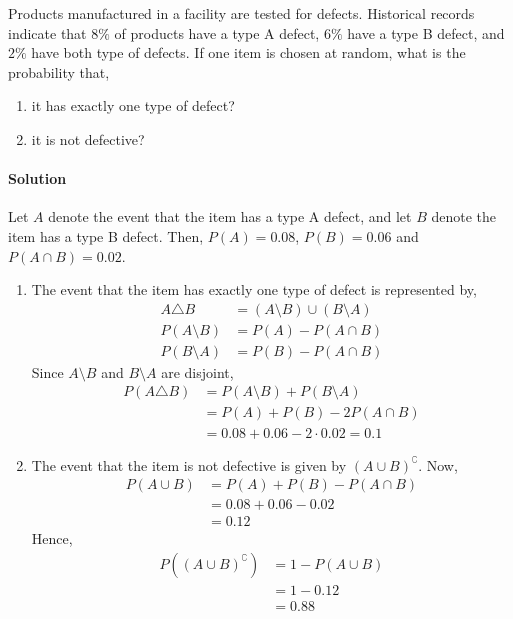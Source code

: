 \begin{example}
    Products manufactured in a facility are tested for defects. Historical
records indicate that $8\%$ of products have a type A defect, $6\%$ have a type
B defect, and $2\%$ have both type of defects. If one item is chosen at random,
what is the probability that, 
\begin{enumerate}[noitemsep,topsep=0pt]
    \item it has exactly one type of defect?
    \item it is not defective?
\end{enumerate}
\paragraph{Solution} Let $A$ denote the event that the item has a type A
defect, and let $B$ denote the item has a type B defect. Then, $P(A) = 0.08$,
$P(B) = 0.06$ and $P(A \cap B) = 0.02$.
\begin{enumerate}[noitemsep,topsep=0pt]
\item
    The event that the item has exactly one type of defect is represented by, 
    \begin{align*}
        A \triangle B &= (A \setminus B) \cup (B \setminus A)                \\
        P(A \setminus B) &= P(A) - P(A \cap B)                               \\
        P(B \setminus A) &= P(B) - P(A \cap B)
    \end{align*}
    Since $A \setminus B$ and $B \setminus A$ are disjoint, 
    \begin{align*}
        P(A \triangle B) &= P(A \setminus B) + P(B \setminus A)              \\
                         &= P(A) + P(B) - 2 P(A \cap B)                      \\
                         &= 0.08 + 0.06 - 2 \cdot 0.02 = 0.1
    \end{align*}
\item
    The event that the item is not defective is given by $(A \cup
    B)^\complement$. Now,
    \begin{align*}
        P(A \cup B) &= P(A) + P(B) - P(A \cap B)                             \\
                    &= 0.08 + 0.06 - 0.02                                    \\
                    &= 0.12
    \end{align*}
    Hence, 
    \begin{align*}
        P((A \cup B)^\complement) &= 1 - P(A \cup B)                         \\
                                  &= 1 - 0.12                                \\
                                  &= 0.88
    \end{align*}
\end{enumerate}
\end{example}